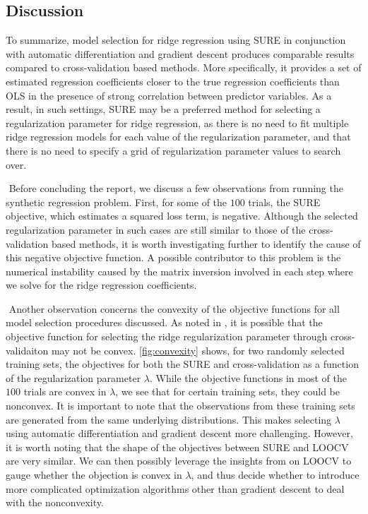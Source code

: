 \subsection{Discussion}
To summarize, model selection for ridge regression using SURE in conjunction with automatic differentiation and gradient descent produces comparable results compared to cross-validation based methods. More specifically, it provides a set of estimated regression coefficients closer to the true regression coefficients than OLS in the presence of strong correlation between predictor variables. As a result, in such settings, SURE may be a preferred method for selecting a regularization parameter for ridge regression, as there is no need to fit multiple ridge regression models for each value of the regularization parameter, and that there is no need to specify a grid of regularization parameter values to search over.

$ $\newline
Before concluding the report, we discuss a few observations from running the synthetic regression problem. First, for some of the $100$ trials, the SURE objective, which estimates a squared loss term, is negative. Although the selected regularization parameter in such cases are still similar to those of the cross-validation based methods, it is worth investigating further to identify the cause of this negative objective function. A possible contributor to this problem is the numerical instability caused by the matrix inversion involved in each step where we solve for the ridge regression coefficients.

$ $\newline
Another observation concerns the convexity of the objective functions for all model selection procedures discussed. As noted in \citet{stephenson2021can}, it is possible that the objective function for selecting the ridge regularization parameter through cross-validaiton may not be convex. \cref{fig:convexity} shows, for two randomly selected training sets, the objectives for both the SURE and cross-validation as a function of the regularization parameter $\lambda$. While the objective functions in most of the $100$ trials are convex in $\lambda$, we see that for certain training sets, they could be nonconvex. It is important to note that the observations from these training sets are generated from the same underlying distributions. This makes selecting $\lambda$ using automatic differentiation and gradient descent more challenging. However, it is worth noting that the shape of the objectives between SURE and LOOCV are very similar. We can then possibly leverage the insights from \citet{stephenson2021can} on LOOCV to gauge whether the objection is convex in $\lambda$, and thus decide whether to introduce more complicated optimization algorithms other than gradient descent to deal with the nonconvexity.

